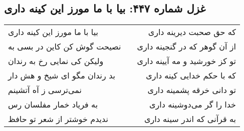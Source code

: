 \begin{center}
\section*{غزل شماره ۴۴۷: بیا با ما مورز این کینه داری}
\label{sec:sh447}
\begin{longtable}{l p{0.5cm} r}
بیا با ما مورز این کینه داری
&&
که حق صحبت دیرینه داری
\\
نصیحت گوش کن کاین در بسی به
&&
از آن گوهر که در گنجینه داری
\\
ولیکن کی نمایی رخ به رندان
&&
تو کز خورشید و مه آیینه داری
\\
بد رندان مگو ای شیخ و هش دار
&&
که با حکم خدایی کینه داری
\\
نمی‌ترسی ز آه آتشینم
&&
تو دانی خرقه پشمینه داری
\\
به فریاد خمار مفلسان رس
&&
خدا را گر می‌دوشینه داری
\\
ندیدم خوشتر از شعر تو حافظ
&&
به قرآنی که اندر سینه داری
\\
\end{longtable}
\end{center}
